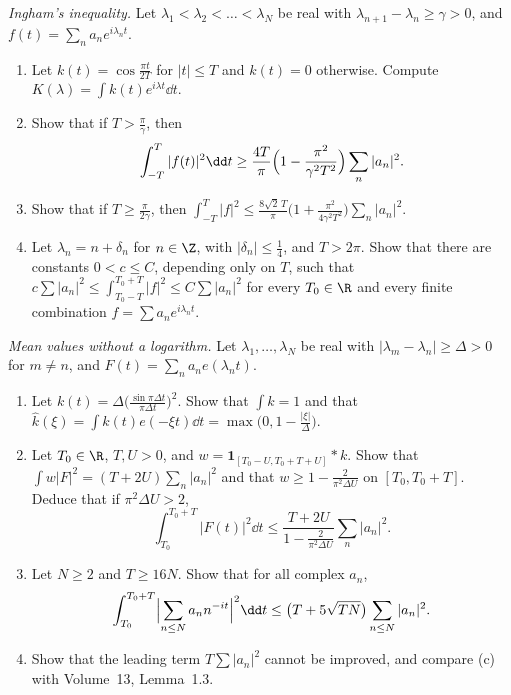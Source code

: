 \begin{exercise}[$\star\star\star$]\label{pb:ingham}
\emph{Ingham's inequality.} Let $\lambda_1<\lambda_2<\dots<\lambda_N$ be real with $\lambda_{n+1}-\lambda_n\ge\gamma>0$, and $f(t)=\sum_na_ne^{i\lambda_nt}$.
\begin{enumerate}[label=(\alph*)]
\item Let $k(t)=\cos\frac{\pi t}{2T}$ for $|t|\le T$ and $k(t)=0$ otherwise. Compute $K(\lambda)=\int k(t)e^{i\lambda t}\dd t$.
\item Show that if $T>\frac\pi\gamma$, then
\[
\int_{-T}^T|f(t)|^2\dd t\ge\frac{4T}\pi\Bigl(1-\frac{\pi^2}{\gamma^2T^2}\Bigr)\sum_n|a_n|^2.
\]
\item Show that if $T\ge\frac\pi{2\gamma}$, then $\int_{-T}^T|f|^2\le\frac{8\sqrt2\,T}\pi\bigl(1+\frac{\pi^2}{4\gamma^2T^2}\bigr)\sum_n|a_n|^2$.
\item Let $\lambda_n=n+\delta_n$ for $n\in\Z$, with $|\delta_n|\le\frac14$, and $T>2\pi$. Show that there are constants $0<c\le C$, depending only on $T$,
such that $c\sum|a_n|^2\le\int_{T_0-T}^{T_0+T}|f|^2\le C\sum|a_n|^2$ for every $T_0\in\R$ and every finite combination $f=\sum a_ne^{i\lambda_nt}$.
\end{enumerate}
\end{exercise}

\begin{exercise}[Journey]\label{pb:mvt}
\emph{Mean values without a logarithm.} Let $\lambda_1,\dots,\lambda_N$ be real with $|\lambda_m-\lambda_n|\ge\Delta>0$ for $m\ne n$, and $F(t)=\sum_na_ne(\lambda_nt)$.
\begin{enumerate}[label=(\alph*)]
\item Let $k(t)=\Delta\bigl(\frac{\sin\pi\Delta t}{\pi\Delta t}\bigr)^2$. Show that $\int k=1$ and that $\hat k(\xi)=\int k(t)e(-\xi t)\dd t=\max\bigl(0,1-\frac{|\xi|}\Delta\bigr)$.
\item Let $T_0\in\R$, $T,U>0$, and $w=\mathbf 1_{[T_0-U,T_0+T+U]}*k$. Show that $\int w|F|^2=(T+2U)\sum_n|a_n|^2$ and that
$w\ge1-\frac2{\pi^2\Delta U}$ on $[T_0,T_0+T]$. Deduce that if $\pi^2\Delta U>2$,
\[
\int_{T_0}^{T_0+T}|F(t)|^2\dd t\le\frac{T+2U}{1-\frac2{\pi^2\Delta U}}\sum_n|a_n|^2.
\]
\item Let $N\ge2$ and $T\ge16N$. Show that for all complex $a_n$,
\[
\int_{T_0}^{T_0+T}\Bigl|\sum_{n\le N}a_nn^{-it}\Bigr|^2\dd t\le\bigl(T+5\sqrt{TN}\bigr)\sum_{n\le N}|a_n|^2.
\]
\item Show that the leading term $T\sum|a_n|^2$ cannot be improved, and compare (c) with Volume~13, Lemma~1.3.
\end{enumerate}
\end{exercise}

